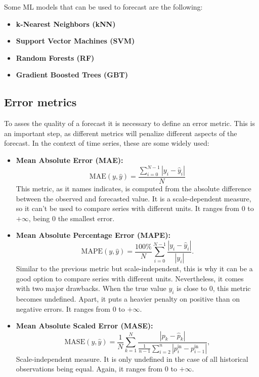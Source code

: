 \noindent Some ML models that can be used to forecast are the following:
\begin{itemize}
    \item \textbf{k-Nearest Neighbors (kNN)}
    \item \textbf{Support Vector Machines (SVM)} %
    \item \textbf{Random Forests (RF)}
    \item \textbf{Gradient Boosted Trees (GBT)}
\end{itemize}

\subsection{Error metrics}
To asses the quality of a forecast it is necessary to define an error metric. This is an important step, as different metrics will penalize different aspects of the forecast. In the context of time series, these are some widely used: \cite{hyndman2006another,ts-metrics-formulas}
\begin{itemize}
    \item \textbf{Mean Absolute Error (MAE):}
    \begin{equation}
        \label{eq:mae}
        \text{MAE}(y, \hat{y}) = \frac{ \sum_{i=0}^{N - 1} |y_i - \hat{y}_i| }{N}
    \end{equation}
    This metric, as it names indicates, is computed from the absolute difference between the observed and forecasted value. It is a scale-dependent measure, so it can't be used to compare series with different units. It ranges from 0 to $+\infty$, being 0 the smallest error.
    \item \textbf{Mean Absolute Percentage Error (MAPE):}
    \begin{equation}
        \label{eq:mape}
        \text{MAPE}(y, \hat{y}) = \frac{100\%}{N} \sum_{i=0}^{N - 1} \frac{|y_i - \hat{y}_i|}{|y_i|}.
    \end{equation}
    Similar to the previous metric but scale-independent, this is why it can be a good option to compare series with different units. Nevertheless, it comes with two major drawbacks. When the true value $y_i$ is close to 0, this metric becomes undefined. Apart, it puts a heavier penalty on positive than on negative errors. It ranges from 0 to $+\infty$.
    \item \textbf{Mean Absolute Scaled Error (MASE):}
    \begin{equation}
        \label{eq:mase}
        \text{MASE}(y, \hat{y}) = \frac{1}{N}\sum_{k=1}^{N}\frac{|p_k-\hat{p}_k|}{\frac{1}{n-1}\sum_{i=2}^{n} |p^\mathrm{in}_i - p^\mathrm{in}_{i-1} |},
    \end{equation}
    Scale-independent measure. It is only undefined in the case of all historical observations being equal. Again, it ranges from 0 to $+\infty$.

\end{itemize}

